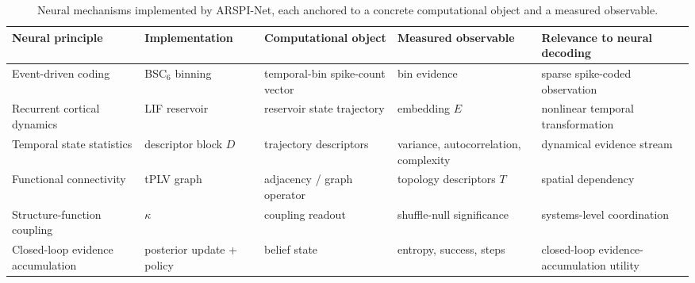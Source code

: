\begin{table}[t]\centering
\caption{Neural mechanisms implemented by ARSPI-Net, each anchored to a concrete computational object and a measured observable.}
\label{tab:neural_mechanisms}
\begin{tabular}{p{2.6cm}p{2.2cm}p{2.8cm}p{3.0cm}p{3.0cm}}
\toprule
Neural principle & Implementation & Computational object & Measured observable & Relevance to neural decoding \\
\midrule
Event-driven coding & BSC$_6$ binning & temporal-bin spike-count vector & bin evidence & sparse spike-coded observation \\
Recurrent cortical dynamics & LIF reservoir & reservoir state trajectory & embedding $E$ & nonlinear temporal transformation \\
Temporal state statistics & descriptor block $D$ & trajectory descriptors & variance, autocorrelation, complexity & dynamical evidence stream \\
Functional connectivity & tPLV graph & adjacency / graph operator & topology descriptors $T$ & spatial dependency \\
Structure-function coupling & $\kappa$ & coupling readout & shuffle-null significance & systems-level coordination \\
Closed-loop evidence accumulation & posterior update + policy & belief state & entropy, success, steps & closed-loop evidence-accumulation utility \\
\bottomrule
\end{tabular}
\end{table}
